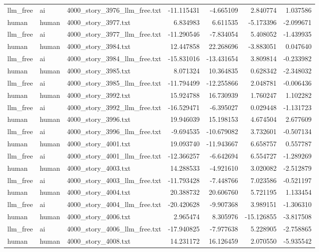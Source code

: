 \begin{longtable}{lllrrrr}
llm\_free & ai & 4000\_story\_3976\_llm\_free.txt & -11.115431 & -4.665109 & 2.840774 & 1.037586 \\
human & human & 4000\_story\_3977.txt & 6.834983 & 6.611535 & -5.173396 & -2.099671 \\
llm\_free & ai & 4000\_story\_3977\_llm\_free.txt & -11.290546 & -7.834054 & 5.408052 & -1.439935 \\
human & human & 4000\_story\_3984.txt & 12.447858 & 22.268696 & -3.883051 & 0.047640 \\
llm\_free & ai & 4000\_story\_3984\_llm\_free.txt & -15.831016 & -13.431654 & 3.809814 & -0.233982 \\
human & human & 4000\_story\_3985.txt & 8.071324 & 10.364835 & 0.628342 & -2.348032 \\
llm\_free & ai & 4000\_story\_3985\_llm\_free.txt & -11.794499 & -12.255866 & 2.048781 & -0.006436 \\
human & human & 4000\_story\_3992.txt & 15.924788 & 16.730939 & 1.760247 & 1.102282 \\
llm\_free & ai & 4000\_story\_3992\_llm\_free.txt & -16.529471 & -6.395027 & 0.029448 & -1.131723 \\
human & human & 4000\_story\_3996.txt & 19.946039 & 15.198153 & 4.674504 & 2.677609 \\
llm\_free & ai & 4000\_story\_3996\_llm\_free.txt & -9.694535 & -10.679082 & 3.732601 & -0.507134 \\
human & human & 4000\_story\_4001.txt & 19.093740 & -11.943667 & 6.658757 & 0.557787 \\
llm\_free & ai & 4000\_story\_4001\_llm\_free.txt & -12.366257 & -6.642694 & 6.554727 & -1.289269 \\
human & human & 4000\_story\_4003.txt & 14.288533 & -4.921610 & 3.020082 & -2.512879 \\
llm\_free & ai & 4000\_story\_4003\_llm\_free.txt & -11.793428 & -7.448766 & 7.023586 & -0.521197 \\
human & human & 4000\_story\_4004.txt & 20.388732 & 20.606760 & 5.721195 & 1.133454 \\
llm\_free & ai & 4000\_story\_4004\_llm\_free.txt & -20.420628 & -9.907368 & 3.989151 & -1.306310 \\
human & human & 4000\_story\_4006.txt & 2.965474 & 8.305976 & -15.126855 & -3.817508 \\
llm\_free & ai & 4000\_story\_4006\_llm\_free.txt & -17.940825 & -7.977638 & 5.228905 & -2.758865 \\
human & human & 4000\_story\_4008.txt & 14.231172 & 16.126459 & 2.070550 & -5.935542 \\

\end{longtable}
